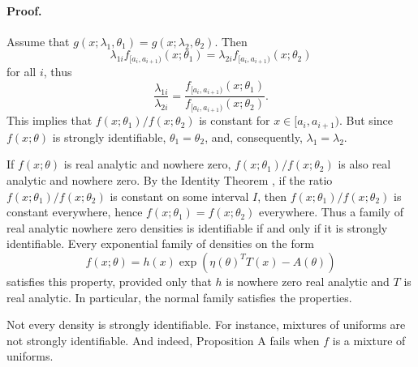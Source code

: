 \documentclass[english]{article}
\begin{document}
\paragraph{Proof.}
Assume that $g(x;\lambda_{1},\theta_{1})=g(x;\lambda_{2},\theta_{2})$.
Then $$\lambda_{1i}f_{[a_{i},a_{i+1})}(x;\theta_{1})=\lambda_{2i}f_{[a_{i},a_{i+1})}(x;\theta_{2})$$
for all $i$, thus
\[
\frac{\lambda_{1i}}{\lambda_{2i}}=\frac{f_{[a_{i},a_{i+1})}(x;\theta_{1})}{f_{[a_{i},a_{i+1})}(x;\theta_{2})}.
\]
This implies that $f(x;\theta_{1})/f(x;\theta_{2})$ is constant for
$x\in[a_{i},a_{i+1})$. But since $f(x;\theta)$ is strongly identifiable,
$\theta_{1}=\theta_{2}$, and, consequently, $\lambda_1 = \lambda_2$.


If $f(x;\theta)$ is real analytic and nowhere zero, $f(x;\theta_{1})/f(x;\theta_{2})$
is also real analytic and nowhere zero. By the Identity Theorem \citep[Corollary 1.2.6]{Krantz2002-bt}, if the ratio
$f(x;\theta_{1})/f(x;\theta_{2})$ is constant on some interval $I$,
then $f(x;\theta_{1})/f(x;\theta_{2})$ is constant everywhere, hence
$f(x;\theta_{1})=f(x;\theta_{2})$ everywhere. Thus a family of real
analytic nowhere zero densities is identifiable if and only if it is
strongly identifiable. Every exponential family of densities on the form
\[
f(x;\theta)=h(x)\exp(\eta(\theta)^{T}T(x)-A(\theta))
\]
satisfies this property, provided only that $h$ is nowhere zero real analytic
and $T$ is real analytic. In particular, the normal family satisfies
the properties.

Not every density is strongly identifiable. For instance, mixtures of uniforms are not strongly identifiable. And indeed, Proposition A fails when $f$ is a mixture of uniforms.






\end{document}
